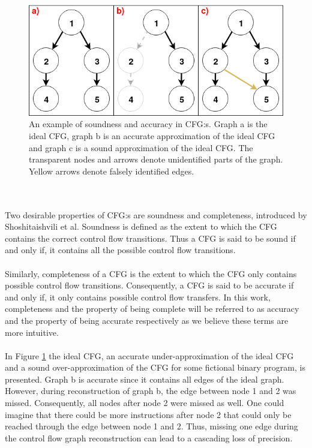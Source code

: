 \documentclass{kththesis}
\begin{document}
\begin{figure}[th]
    \centering
    \includegraphics[scale=0.6]{Images/SoundAccurateGraph.png}
    \caption[An example of soundness and accuracy in CFG:s.]{An example of soundness and accuracy in CFG:s. Graph a is the ideal CFG, graph b is an accurate approximation of the ideal CFG and graph c is a sound approximation of the ideal CFG. The transparent nodes and arrows denote unidentified parts of the graph. Yellow arrows denote falsely identified edges.}
    \label{fig:SoundAccurateGraph}
\end{figure}
\\ \\
Two desirable properties of CFG:s are soundness and completeness, introduced by Shoshitaishvili et al\cite{angr}. Soundness is defined as the extent to which the CFG contains the correct control flow transitions. Thus a CFG is said to be sound if and only if, it contains all the possible control flow transitions. 
\\ \\
Similarly, completeness of a CFG is the extent to which the CFG only contains possible control flow transitions. Consequently, a CFG is said to be accurate if and only if, it only contains possible control flow transfers. In this work, completeness and the property of being complete will be referred to as accuracy and the property of being accurate respectively as we believe these terms are more intuitive.
\\ \\
In Figure \ref{fig:SoundAccurateGraph} the ideal CFG, an accurate under-approximation of the ideal CFG and a sound over-approximation of the CFG for some fictional binary program, is presented. Graph b is accurate since it contains all edges of the ideal graph. However, during reconstruction of graph b, the edge between node 1 and 2 was missed. Consequently, all nodes after node 2 were missed as well. One could imagine that there could be more instructions after node 2 that could only be reached through the edge between node 1 and 2. Thus, missing one edge during the control flow graph reconstruction can lead to a cascading loss of precision.
\end{document}
